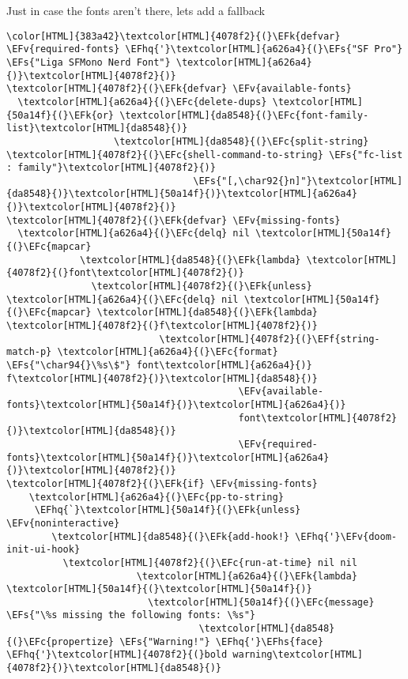 \documentclass{scrartcl}
\newcommand{\EFk}[1]{\textcolor{EFk}{#1}} %
\newcommand{\EFs}[1]{\textcolor{EFs}{#1}} %
\newcommand{\EFc}[1]{\textcolor{EFc}{#1}} %
\newcommand{\EFv}[1]{\textcolor{EFv}{#1}} %
\newcommand{\EFf}[1]{\textcolor{EFf}{#1}} %
\newcommand{\EFhq}[1]{\textcolor{EFhq}{#1}} %
\newcommand{\EFhs}[1]{\textcolor{EFhs}{#1}} %
\begin{document}
Just in case the fonts aren't there, lets add a fallback
\begin{Code}
\begin{Verbatim}[]
\color[HTML]{383a42}\textcolor[HTML]{4078f2}{(}\EFk{defvar} \EFv{required-fonts} \EFhq{'}\textcolor[HTML]{a626a4}{(}\EFs{"SF Pro"} \EFs{"Liga SFMono Nerd Font"} \textcolor[HTML]{a626a4}{)}\textcolor[HTML]{4078f2}{)}
\textcolor[HTML]{4078f2}{(}\EFk{defvar} \EFv{available-fonts}
  \textcolor[HTML]{a626a4}{(}\EFc{delete-dups} \textcolor[HTML]{50a14f}{(}\EFk{or} \textcolor[HTML]{da8548}{(}\EFc{font-family-list}\textcolor[HTML]{da8548}{)}
                   \textcolor[HTML]{da8548}{(}\EFc{split-string} \textcolor[HTML]{4078f2}{(}\EFc{shell-command-to-string} \EFs{"fc-list : family"}\textcolor[HTML]{4078f2}{)}
                                 \EFs{"[,\char92{}n]"}\textcolor[HTML]{da8548}{)}\textcolor[HTML]{50a14f}{)}\textcolor[HTML]{a626a4}{)}\textcolor[HTML]{4078f2}{)}
\textcolor[HTML]{4078f2}{(}\EFk{defvar} \EFv{missing-fonts}
  \textcolor[HTML]{a626a4}{(}\EFc{delq} nil \textcolor[HTML]{50a14f}{(}\EFc{mapcar}
             \textcolor[HTML]{da8548}{(}\EFk{lambda} \textcolor[HTML]{4078f2}{(}font\textcolor[HTML]{4078f2}{)}
               \textcolor[HTML]{4078f2}{(}\EFk{unless} \textcolor[HTML]{a626a4}{(}\EFc{delq} nil \textcolor[HTML]{50a14f}{(}\EFc{mapcar} \textcolor[HTML]{da8548}{(}\EFk{lambda} \textcolor[HTML]{4078f2}{(}f\textcolor[HTML]{4078f2}{)}
                           \textcolor[HTML]{4078f2}{(}\EFf{string-match-p} \textcolor[HTML]{a626a4}{(}\EFc{format} \EFs{"\char94{}\%s\$"} font\textcolor[HTML]{a626a4}{)} f\textcolor[HTML]{4078f2}{)}\textcolor[HTML]{da8548}{)}
                                         \EFv{available-fonts}\textcolor[HTML]{50a14f}{)}\textcolor[HTML]{a626a4}{)}
                                         font\textcolor[HTML]{4078f2}{)}\textcolor[HTML]{da8548}{)}
                                         \EFv{required-fonts}\textcolor[HTML]{50a14f}{)}\textcolor[HTML]{a626a4}{)}\textcolor[HTML]{4078f2}{)}
\textcolor[HTML]{4078f2}{(}\EFk{if} \EFv{missing-fonts}
    \textcolor[HTML]{a626a4}{(}\EFc{pp-to-string}
     \EFhq{`}\textcolor[HTML]{50a14f}{(}\EFk{unless} \EFv{noninteractive}
        \textcolor[HTML]{da8548}{(}\EFk{add-hook!} \EFhq{'}\EFv{doom-init-ui-hook}
          \textcolor[HTML]{4078f2}{(}\EFc{run-at-time} nil nil
                       \textcolor[HTML]{a626a4}{(}\EFk{lambda} \textcolor[HTML]{50a14f}{(}\textcolor[HTML]{50a14f}{)}
                         \textcolor[HTML]{50a14f}{(}\EFc{message} \EFs{"\%s missing the following fonts: \%s"}
                                  \textcolor[HTML]{da8548}{(}\EFc{propertize} \EFs{"Warning!"} \EFhq{'}\EFhs{face} \EFhq{'}\textcolor[HTML]{4078f2}{(}bold warning\textcolor[HTML]{4078f2}{)}\textcolor[HTML]{da8548}{)}

\end{Verbatim}
\end{Code}
\end{document}

